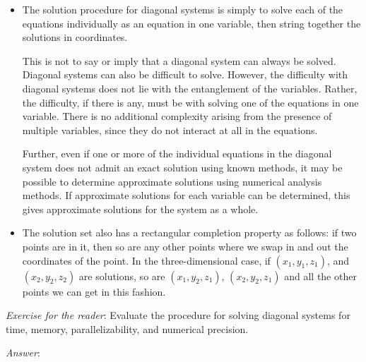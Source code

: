 \documentclass[10pt]{amsart}
\begin{document}
\begin{itemize}
\item The solution procedure for diagonal systems is simply to solve
  each of the equations individually as an equation in one variable,
  then string together the solutions in coordinates.

  This is not to say or imply that a diagonal system can always be
  solved. Diagonal systems can also be difficult to solve. However,
  the difficulty with diagonal systems does not lie with the
  entanglement of the variables. Rather, the difficulty, if there is
  any, must be with solving one of the equations in one
  variable. There is no additional complexity arising from the
  presence of multiple variables, since they do not interact at all in
  the equations.

  Further, even if one or more of the individual equations in the
  diagonal system does not admit an exact solution using known
  methods, it may be possible to determine approximate solutions using
  numerical analysis methods. If approximate solutions for each
  variable can be determined, this gives approximate solutions for the
  system as a whole.
\item The solution set also has a rectangular completion property as
  follows: if two points are in it, then so are any other points where
  we swap in and out the coordinates of the point. In the
  three-dimensional case, if $(x_1,y_1,z_1)$, and $(x_2,y_2,z_2)$ are
  solutions, so are $(x_1,y_2,z_1)$, $(x_2,y_2,z_1)$ and all the other
  points we can get in this fashion.
\end{itemize}

{\em Exercise for the reader}: Evaluate the procedure for solving
diagonal systems for time, memory, parallelizability, and numerical
precision.

{\em Answer}:
\end{document}
